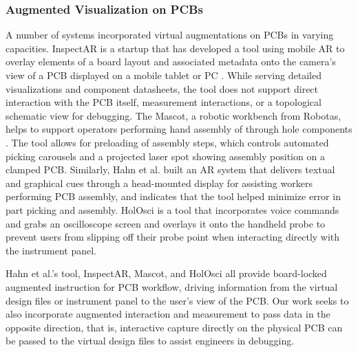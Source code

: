 \documentclass [11pt, proquest] {uwthesis}[2020/02/24]
\begin{document}
\subsubsection{Augmented Visualization on PCBs}
A number of systems incorporated virtual augmentations on PCBs in varying capacities.
InspectAR is a startup that has developed a tool using mobile AR to overlay elements of a board layout and associated metadata onto the camera's view of a PCB displayed on a mobile tablet or PC \cite{InspectARTools}. While serving detailed visualizations and component datasheets, the tool does not support
direct interaction with the PCB itself, measurement interactions,
or a topological schematic view for debugging. 
The Mascot, a robotic workbench from Robotas, helps to support operators performing hand assembly of through hole components \cite{MascotRobotas}.
The tool allows for preloading of assembly steps, which controls automated picking carousels and a projected laser spot showing assembly position on a clamped PCB.
Similarly, Hahn et al. \cite{Hahn2015AugmentedProcess} built an AR system that delivers textual and graphical cues through a head-mounted display for assisting workers performing PCB assembly, and indicates that the tool helped minimize error in part picking and assembly.
HolOsci \cite{Javaheri2018HolOsci} is a tool that incorporates voice commands and grabs an oscilloscope screen and overlays it onto the handheld probe to prevent users from slipping off their probe point when interacting directly with the instrument panel.

Hahn et al.’s tool, InspectAR, Mascot, and HolOsci all provide board-locked augmented instruction for PCB workflow, driving information from the virtual design files or instrument panel to the user’s view of the PCB.
Our work seeks to also incorporate augmented interaction and measurement to pass data in the opposite direction, that is, interactive capture directly on the physical PCB can be passed to the virtual design files to assist engineers in debugging.
\end{document}
